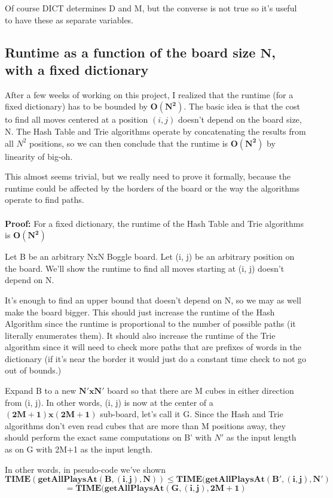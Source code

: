 \documentclass{article}
\newcommand{\bo}[1]{\textbf{#1}}
\begin{document}
Of course DICT determines D and M, but the converse is not true so it's useful to have these as separate variables. 

\subsection{Runtime as a function of the board size $\mathbf{N}$, with a fixed dictionary} 
After a few weeks of working on this project, I realized that the runtime (for a fixed  dictionary) has to be bounded by $\mathbf{O(N^2)}$. The basic idea is that the cost to find all moves centered at a position $(i, j)$ doesn't depend on the board size, N. The Hash Table and Trie algorithms operate by concatenating the results from all $N^2$ positions, so we can then conclude that the runtime is $\mathbf{O(N^2)}$ by linearity of big-oh. 

This almost seems trivial, but we really need to prove it formally, because the runtime could be affected by the borders of the board or the way the algorithms operate to find paths. 
\\
\\
\large \bo{Proof:} For a fixed dictionary, the runtime of the Hash Table and Trie algorithms is $\mathbf{O(N^2)}$ \normalsize 

Let B be an arbitrary NxN Boggle board. Let (i, j) be an arbitrary position on the board. We'll show the runtime to find all moves starting at (i, j) doesn't depend on N. 

It's enough to find an upper bound that doesn't depend on N, so we may as well make the board bigger. This should just increase the runtime of the Hash Algorithm since the runtime is proportional to the number of possible paths (it literally enumerates them). It should also increase the runtime of the Trie algorithm since it will need to check more paths that are prefixes of words in the dictionary (if it's near the border it would just do a constant time check to not go out of bounds.) 

Expand B to a new $\mathbf{N'xN'}$ board so that there are M cubes in either direction from (i, j). In other words, (i, j) is now at the center of a $\mathbf{(2M+1)x(2M+1)}$ sub-board, let's call it G. Since the Hash and Trie algorithms don't even read cubes that are more than M positions away, they should perform the exact same computations on B' with $N'$ as the input length as on G with 2M+1 as the input length.

In other words, in pseudo-code we've shown 
$$\mathbf{TIME(getAllPlaysAt(B, (i,j), N)) \leq TIME(getAllPlaysAt(B', (i,j), N')}$$ 
$$\mathbf{= TIME(getAllPlaysAt(G, (i,j), 2M+1)}$$   
\end{document}
